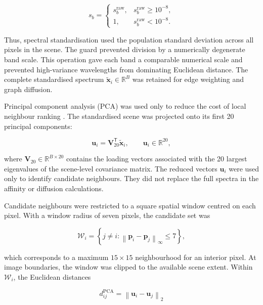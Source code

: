 \documentclass[10pt,a4paper,fleqn]{article}
\begin{document}
\begin{equation}
s_b
=
\begin{cases}
s_b^{\mathrm{raw}}, & s_b^{\mathrm{raw}}\geq10^{-8},\\
1, & s_b^{\mathrm{raw}}<10^{-8}.
\end{cases}
\label{eq:band_std_guard}
\end{equation}

Thus, spectral standardisation used the population standard deviation across
all pixels in the scene. The guard prevented division by a numerically
degenerate band scale. This operation gave each band a comparable numerical
scale and prevented high-variance wavelengths from dominating Euclidean
distance. The complete
standardised spectrum
\(\widetilde{\mathbf{x}}_i\in\mathbb{R}^{B}\) was retained for edge weighting
and graph diffusion.

Principal component analysis (PCA) was used only to reduce the cost of local
neighbour ranking \citep{jolliffe2016}. The standardised scene was projected
onto its first 20 principal components:

\begin{equation}
\mathbf{u}_i
=
\mathbf{V}_{20}^{\mathsf T}
\widetilde{\mathbf{x}}_i,
\qquad
\mathbf{u}_i\in\mathbb{R}^{20},
\label{eq:pca_search}
\end{equation}

where
\(\mathbf{V}_{20}\in\mathbb{R}^{B\times20}\) contains the loading vectors
associated with the 20 largest eigenvalues of the scene-level covariance
matrix. The reduced vectors \(\mathbf{u}_i\) were used only to identify
candidate neighbours. They did not replace the full spectra in the affinity
or diffusion calculations.

Candidate neighbours were restricted to a square spatial window centred on
each pixel. With a window radius of seven pixels, the candidate set was

\begin{equation}
\mathcal{W}_i
=
\left\{
j\neq i:
\left\|
\mathbf{p}_i-\mathbf{p}_j
\right\|_{\infty}
\leq 7
\right\},
\label{eq:local_window}
\end{equation}

which corresponds to a maximum \(15\times15\) neighbourhood for an interior
pixel. At image boundaries, the window was clipped to the available scene
extent. Within \(\mathcal{W}_i\), the Euclidean distances

\begin{equation}
d^{\mathrm{PCA}}_{ij}
=
\left\|
\mathbf{u}_i-\mathbf{u}_j
\right\|_2
\label{eq:pca_distance}
\end{equation}
\end{document}
